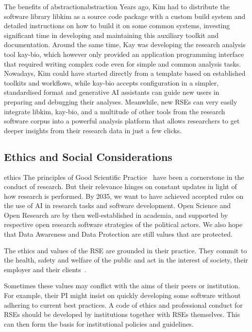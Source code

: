 \documentclass{eceasst}
\begin{document}
\begin{story}{The benefits of abstraction}{abstraction}
Years ago, Kim had to distribute the software library libkim as a source code package
with a custom build system and detailed instructions on how to build it on some common systems,
investing significant time in developing and maintaining this auxiliary toolkit and documentation.
Around the same time, Kay was developing the research analysis tool kay-bio,
which however only provided an application programming interface that
required writing complex code even for simple and common analysis tasks.
Nowadays, Kim could have started directly from a template based on established toolkits and workflows,
while kay-bio accepts configuration in a simpler, standardised format and generative AI assistants
can guide new users in preparing and debugging their analyses.
Meanwhile, new RSEs can very easily integrate libkim, kay-bio, and a multitude
of other tools from the research software corpus into a powerful analysis
platform that allows researchers to get deeper insights from their research data
in just a few clicks.
\end{story}

\subsection{Ethics and Social Considerations}
\begin{whatis}{}{ethics}
The principles of Good Scientific Practice~\cite{dfg_gsp} have been a cornerstone in the conduct of research.
But their relevance hinges on constant updates in light of how research is performed.
By 2035, we want to have achieved accepted rules on the use of AI in research tasks and software development.
Open Science and Open Research are by then well-established in academia, and supported by respective open research software
strategies of the political actors. We also hope that Data Awareness and Data Protection are still values
that are protected.
\end{whatis}

The ethics and values of the RSE are grounded in their practice.
They commit to the health, safety and welfare of the public and act in the interest of society, their employer and their clients~\cite{Goth2024}.

Sometimes these values may conflict with the aims of their peers or institution.
For example, their PI might insist on quickly developing some software without adhering to current best practices.
A code of ethics and professional conduct for RSEs should be developed by institutions together with RSEs themselves.
This can then form the basis for institutional policies and guidelines.
\end{document}
